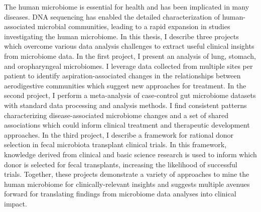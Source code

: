 
The human microbiome is essential for health and has been implicated in many diseases.
DNA sequencing has enabled the detailed characterization of human-associated microbial communities, leading to a rapid expansion in studies investigating the human microbiome.
In this thesis, I describe three projects which overcome various data analysis challenges to extract useful clinical insights from microbiome data.
In the first project, I present an analysis of lung, stomach, and oropharyngeal microbiomes.
I leverage data collected from multiple sites per patient to identify aspiration-associated changes in the relationships between aerodigestive communities which suggest new approaches for treatment.
In the second project, I perform a meta-analysis of case-control gut microbiome datasets with standard data processing and analysis methods.
I find consistent patterns characterizing disease-associated microbiome changes and a set of shared associations which could inform clinical treatment and therapeutic development approaches.
In the third project, I describe a framework for rational donor selection in fecal microbiota transplant clinical trials.
In this framework, knowledge derived from clinical and basic science research is used to inform which donor is selected for fecal transplants, increasing the likelihood of successful trials.
Together, these projects demonstrate a variety of approaches to mine the human microbiome for clinically-relevant insights and suggests multiple avenues forward for translating findings from microbiome data analyses into clinical impact.
